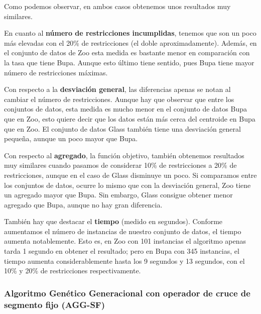 Como podemos observar, en ambos casos obtenemos unos resultados muy similares.

En cuanto al \textbf{número de restricciones incumplidas}, tenemos que son un poco más elevadas con el 20\% de restricciones (el doble aproximadamente). Además, 
en el conjunto de datos de Zoo esta medida es bastante menor en comparación con la tasa que tiene Bupa. Aunque esto último tiene sentido, pues Bupa tiene mayor número de restricciones máximas.

Con respecto a la \textbf{desviación general}, las diferencias apenas se notan al cambiar el número de restricciones. Aunque hay que observar que 
entre los conjuntos de datos, esta medida es mucho menor en el conjunto de datos Bupa que en Zoo, esto quiere decir que los datos están más cerca del centroide en Bupa que en Zoo.
El conjunto de datos Glass también tiene una desviación general pequeña, aunque un poco mayor que Bupa.

Con respecto al \textbf{agregado}, la función objetivo, también obtenemos resultados muy similares cuando pasamos de considerar 10\% de restricciones a 20\% de restricciones, aunque en el caso de Glass disminuye un poco.
Si comparamos entre los conjuntos de datos, ocurre lo mismo que con la desviación general, Zoo tiene un agregado mayor que Bupa. Sin embargo, Glass consigue obtener menor agregado que Bupa, aunque no hay gran diferencia.

También hay que destacar el \textbf{tiempo} (medido en segundos). Conforme aumentamos el número de instancias de nuestro conjunto de datos, el tiempo aumenta notablemente. Esto es, en Zoo con 101 instancias el algoritmo apenas tarda 1 segundo en obtener el resultado; 
pero en Bupa con 345 instancias, el tiempo aumenta considerablemente hasta los 9 segundos y 13 segundos, con el 10\% y 20\% de restricciones respectivamente.

\subsubsection{Algoritmo Genético Generacional con operador de cruce de segmento fijo (AGG-SF)}

